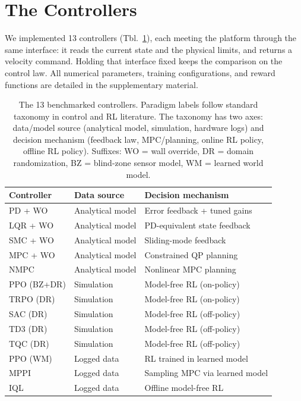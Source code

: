 \section{The Controllers}
\label{sec:controllers}

We implemented 13 controllers (Tbl.~\ref{tab:controllers}), each meeting the platform through the same interface: it reads the current state and the physical limits, and returns a velocity command.
Holding that interface fixed keeps the comparison on the control law.
All numerical parameters, training configurations, and reward functions are detailed in the supplementary material.

\begin{table}[t]
\centering
\caption{The 13 benchmarked controllers. Paradigm labels follow
  standard taxonomy in control and RL literature. The taxonomy has two axes:
  data/model source (analytical model, simulation, hardware logs) and
  decision mechanism (feedback law, MPC/planning, online RL policy, offline RL policy).
  Suffixes: WO = wall override, DR = domain randomization, BZ = blind-zone sensor model,
  WM = learned world model.}
\label{tab:controllers}
\setlength{\tabcolsep}{3pt}
\footnotesize
\begin{tabular}{lll}
\toprule
\textbf{Controller} & \textbf{Data source} & \textbf{Decision mechanism} \\
\midrule
PD + WO        & Analytical model     & Error feedback + tuned gains \\
LQR + WO       & Analytical model     & PD-equivalent state feedback \\
SMC + WO       & Analytical model     & Sliding-mode feedback \\
\midrule
MPC + WO       & Analytical model     & Constrained QP planning \\
NMPC           & Analytical model     & Nonlinear MPC planning \\
\midrule
PPO (BZ+DR)    & Simulation           & Model-free RL (on-policy) \\
TRPO (DR)      & Simulation           & Model-free RL (on-policy) \\
SAC (DR)       & Simulation           & Model-free RL (off-policy) \\
TD3 (DR)       & Simulation           & Model-free RL (off-policy) \\
TQC (DR)       & Simulation           & Model-free RL (off-policy) \\
\midrule
PPO (WM)       & Logged data          & RL trained in learned model \\
MPPI           & Logged data          & Sampling MPC via learned model \\
IQL            & Logged data          & Offline model-free RL \\
\bottomrule
\end{tabular}
\end{table}

